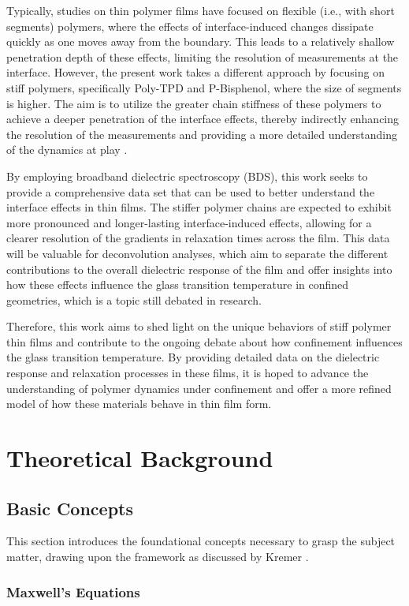 Typically, studies on thin polymer films have focused on flexible (i.e., with short segments) polymers, where the effects of interface-induced changes dissipate quickly as one moves away from the boundary. This leads to a relatively shallow penetration depth of these effects, limiting the resolution of measurements at the interface. However, the present work takes a different approach by focusing on stiff polymers, specifically Poly-TPD and P-Bisphenol, where the size of segments is higher. The aim is to utilize the greater chain stiffness of these polymers to achieve a deeper penetration of the interface effects, thereby indirectly enhancing the resolution of the measurements and providing a more detailed understanding of the dynamics at play \cite{cheng2024}.

By employing broadband dielectric spectroscopy (BDS), this work seeks to provide a comprehensive data set that can be used to better understand the interface effects in thin films. The stiffer polymer chains are expected to exhibit more pronounced and longer-lasting interface-induced effects, allowing for a clearer resolution of the gradients in relaxation times across the film. This data will be valuable for deconvolution analyses, which aim to separate the different contributions to the overall dielectric response of the film and offer insights into how these effects influence the glass transition temperature in confined geometries, which is a topic still debated in research.

Therefore, this work aims to shed light on the unique behaviors of stiff polymer thin films and contribute to the ongoing debate about how confinement influences the glass transition temperature. By providing detailed data on the dielectric response and relaxation processes in these films, it is hoped to advance the understanding of polymer dynamics under confinement and offer a more refined model of how these materials behave in thin film form.
\chapter{Theoretical Background}
\section{Basic Concepts}
This section introduces the foundational concepts necessary to grasp the subject matter, drawing upon the framework as discussed by Kremer \cite{kremer2003}.
\subsection{Maxwell's Equations}

